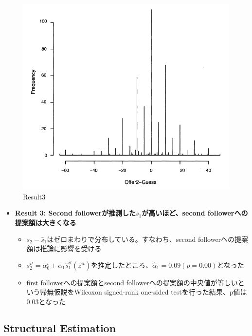 \documentclass[../root]{subfiles}
\begin{document}
    \begin{figure}
    \centering
    \includegraphics[width = 0.8\linewidth]{1009kato/95456757-c76f9100-09aa-11eb-9720-ade88c749ae1.png}
    \caption{Result3}
    \end{figure}

    \begin{itemize}
    
    \item
      \textbf{Result 3: Second followerが推測した\(s_1\)が高いほど、second followerへの提案額は大きくなる}

      \begin{itemize}
      
      \item
        \(s_2 - \hat{s}_1\)はゼロまわりで分布している。すなわち、second followerへの提案額は推論に影響を受ける
      \item
        \(s_2^{it} = \alpha_0^i + \alpha_1 \hat{s}_1^{it}(z^{it})\)を推定したところ、\(\hat{\alpha}_1 = 0.09 (p = 0.00)\)となった
      \item
        first followerへの提案額とsecond followerへの提案額の中央値が等しいという帰無仮説をWilcoxon signed-rank one-sided testを行った結果、p値は0.03となった
      \end{itemize}
    \end{itemize}

    \hypertarget{structural-estimation}{%
    \subsection{Structural Estimation}\label{structural-estimation}}
\end{document}
